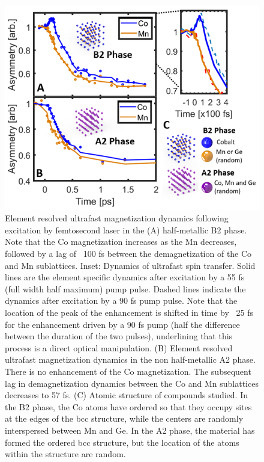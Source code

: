 \begin{figure}
	\label{fig: Heus2}
	\begin{center}
		\includegraphics[width=150mm]{figs/Heus2}
	\end{center}
	\caption{Element resolved ultrafast magnetization dynamics following excitation by femtosecond laser in the (A) half-metallic B2 phase. Note that the Co magnetization increases as the Mn decreases, followed by a lag of ~100 fs between the demagnetization of the Co and Mn sublattices. Inset: Dynamics of ultrafast spin transfer. Solid lines are the element specific dynamics after excitation by a 55 fs (full width half maximum) pump pulse. Dashed lines indicate the dynamics after excitation by a 90 fs pump pulse. Note that the location of the peak of the enhancement is shifted in time by ~25 fs for the enhancement driven by a 90 fs pump (half the difference between the duration of the two pulses), underlining that this process is a direct optical manipulation. (B) Element resolved ultrafast magnetization dynamics in the non half-metallic A2 phase. There is no enhancement of the Co magnetization. The subsequent lag in demagnetization dynamics between the Co and Mn sublattices decreases to 57 fs. (C) Atomic structure of compounds studied. In the B2 phase, the Co atoms have ordered so that they occupy sites at the edges of the bcc structure, while the centers are randomly interspersed between Mn and Ge. In the A2 phase, the material has formed the ordered bcc structure, but the location of the atoms within the structure are random.}
\end{figure}

